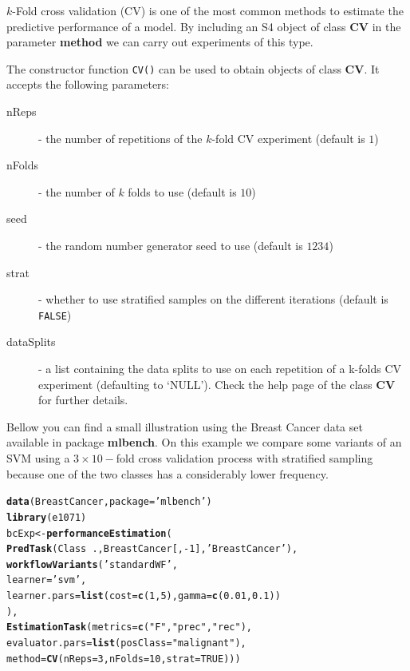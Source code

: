 \documentclass[10pt,a4paper]{article}\usepackage[]{graphicx}\usepackage[]{color}
\makeatletter
\newcommand{\hlnum}[1]{\textcolor[rgb]{0.686,0.059,0.569}{#1}}%
\newcommand{\hlstr}[1]{\textcolor[rgb]{0.192,0.494,0.8}{#1}}%
\newcommand{\hlopt}[1]{\textcolor[rgb]{0,0,0}{#1}}%
\newcommand{\hlstd}[1]{\textcolor[rgb]{0.345,0.345,0.345}{#1}}%
\newcommand{\hlkwb}[1]{\textcolor[rgb]{0.69,0.353,0.396}{#1}}%
\newcommand{\hlkwc}[1]{\textcolor[rgb]{0.333,0.667,0.333}{#1}}%
\newcommand{\hlkwd}[1]{\textcolor[rgb]{0.737,0.353,0.396}{\textbf{#1}}}%
\newenvironment{kframe}{%
 \def\at@end@of@kframe{}%
 \ifinner\ifhmode%
  \def\at@end@of@kframe{\end{minipage}}%
  \begin{minipage}{\columnwidth}%
 \fi\fi%
 \def\FrameCommand##1{\hskip\@totalleftmargin \hskip-\fboxsep
 \colorbox{shadecolor}{##1}\hskip-\fboxsep
     \hskip-\linewidth \hskip-\@totalleftmargin \hskip\columnwidth}%
 \MakeFramed {\advance\hsize-\width
   \@totalleftmargin\z@ \linewidth\hsize
   \@setminipage}}%
 {\par\unskip\endMakeFramed%
 \at@end@of@kframe}
\newenvironment{knitrout}{}{} %
\makeatother
\begin{document}
$k$-Fold cross validation (CV) is one of the most common 
methods to estimate the predictive performance of a model. By
including an S4 object of class \textbf{CV} in the parameter \textbf{method} we can carry
out experiments of this type.

The constructor function \texttt{CV()} can be used to obtain objects
of class \textbf{CV}. It accepts the following parameters:

\begin{description}
\item[nReps] - the number of repetitions of the $k$-fold CV experiment (default is $1$)
\item[nFolds] - the number of $k$ folds to use (default is $10$)
\item[seed] - the random number generator seed to use (default is $1234$)
\item[strat] - whether to use stratified samples on the different iterations (default is \texttt{FALSE})
\item[dataSplits] - a list containing the data splits to
          use on each repetition of a k-folds CV experiment (defaulting
          to ‘NULL’). Check the help page of the
  class \textbf{CV} for further details. 
\end{description}

Bellow you can find a small illustration using the Breast Cancer data
set available in package \textbf{mlbench}. On this example we compare
some variants of an SVM using a $3\times 10-$fold cross validation
process with stratified sampling because one of the two classes has a
considerably lower frequency.

\begin{knitrout}\footnotesize
{}\color{fgcolor}\begin{kframe}
\begin{alltt}
\hlkwd{data}\hlstd{(BreastCancer,}\hlkwc{package}\hlstd{=}\hlstr{'mlbench'}\hlstd{)}
\hlkwd{library}\hlstd{(e1071)}
\hlstd{bcExp} \hlkwb{<-} \hlkwd{performanceEstimation}\hlstd{(}
  \hlkwd{PredTask}\hlstd{(Class} \hlopt{~} \hlstd{.,BreastCancer[,}\hlopt{-}\hlnum{1}\hlstd{],}\hlstr{'BreastCancer'}\hlstd{),}
  \hlkwd{workflowVariants}\hlstd{(}\hlstr{'standardWF'}\hlstd{,}
           \hlkwc{learner}\hlstd{=}\hlstr{'svm'}\hlstd{,}
           \hlkwc{learner.pars}\hlstd{=}\hlkwd{list}\hlstd{(}\hlkwc{cost}\hlstd{=}\hlkwd{c}\hlstd{(}\hlnum{1}\hlstd{,}\hlnum{5}\hlstd{),}\hlkwc{gamma}\hlstd{=}\hlkwd{c}\hlstd{(}\hlnum{0.01}\hlstd{,}\hlnum{0.1}\hlstd{))}
          \hlstd{),}
  \hlkwd{EstimationTask}\hlstd{(}\hlkwc{metrics}\hlstd{=}\hlkwd{c}\hlstd{(}\hlstr{"F"}\hlstd{,}\hlstr{"prec"}\hlstd{,}\hlstr{"rec"}\hlstd{),}
                 \hlkwc{evaluator.pars}\hlstd{=}\hlkwd{list}\hlstd{(}\hlkwc{posClass}\hlstd{=}\hlstr{"malignant"}\hlstd{),}
                 \hlkwc{method}\hlstd{=}\hlkwd{CV}\hlstd{(}\hlkwc{nReps}\hlstd{=}\hlnum{3}\hlstd{,}\hlkwc{nFolds}\hlstd{=}\hlnum{10}\hlstd{,}\hlkwc{strat}\hlstd{=}\hlnum{TRUE}\hlstd{)))}
\end{alltt}
\end{kframe}
\end{knitrout}
\end{document}
